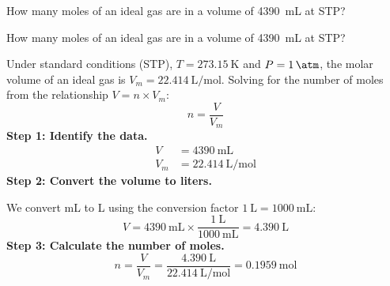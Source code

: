 \begin{exercise}
    How many moles of an ideal gas are in a volume of \qty{4390}{\mL} at STP?
    \begin{solu}
        How many moles of an ideal gas are in a volume of \qty{4390}{\mL} at STP?


        Under standard conditions (STP), $T = \qty{273.15}{\kelvin}$ and $P = \qty{1}{\atm}$,
        the molar volume of an ideal gas is $V_m = \qty{22.414}{\liter\per\mol}$. Solving
        for the number of moles from the relationship $V = n \times V_m$:
        \begin{equation*}
            n = \frac{V}{V_m}
        \end{equation*}
        \textbf{Step 1: Identify the data.}
        \begin{align*}
            V   &= \qty{4390}{\mL} \\
            V_m &= \qty{22.414}{\liter\per\mol}
        \end{align*}
        \textbf{Step 2: Convert the volume to liters.}

        We convert mL to L using the conversion factor $\qty{1}{\liter} = \qty{1000}{\mL}$:
        \begin{equation*}
            V = \qty{4390}{\mL} \times \frac{\qty{1}{\liter}}{\qty{1000}{\mL}}
            = \qty{4.390}{\liter}
        \end{equation*}
        \textbf{Step 3: Calculate the number of moles.}
        \begin{equation*}
            n = \frac{V}{V_m} = \frac{\qty{4.390}{\liter}}{\qty{22.414}{\liter\per\mol}}
            = \boxed{\qty{0.1959}{\mol}}
        \end{equation*}
    \end{solu}
\end{exercise}
